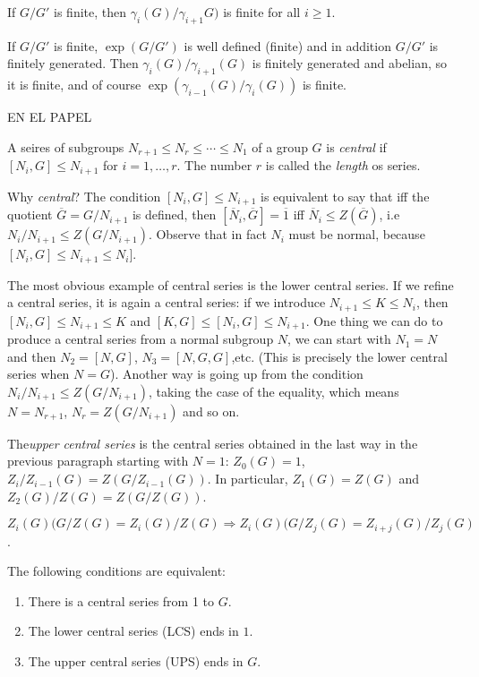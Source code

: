 \documentclass[twoside, 11pt]{article}
\begin{document}
\begin{coro}
If $G/G'$ is finite, then $\gamma_i(G)/\gamma_{i+1}G)$ is finite for all $i\geq 1$. 
\end{coro}
\begin{dem}
If $G/G'$ is finite, $\exp(G/G')$ is well defined (finite) and in addition $G/G'$ is finitely generated. Then $\gamma_i(G)/\gamma_{i+1}(G)$ is finitely generated and abelian, so it is finite, and of course $\exp(\gamma_{i-1}(G)/\gamma_i(G))$ is finite. 
\end{dem}
\begin{ej}
EN EL PAPEL
\end{ej}

\begin{defi}
A seires of subgroups $N_{r+1}\leq N_r\leq\cdots\leq N_1$ of a group $G$ is \emph{central} if $[N_i,G]\leq N_{i+1}$ for $i=1,\dots, r$. The number $r$ is called the \emph{length} os series.
\end{defi}

Why \emph{central}? The condition $[N_i,G]\leq N_{i+1}$ is equivalent to say that iff the quotient $\overline{G}=G/N_{i+1}$ is defined, then $[\overline{N}_i,\overline{G}]=\overline{1}$ iff $\overline{N}_i\leq Z(\overline{G})$, i.e $N_i/N_{i+1}\leq Z(G/N_{i+1})$. Observe that in fact $N_i$ must be normal, because $[N_i,G]\leq N_{i+1}\leq N_i]$. 

The most obvious example of central series is the lower central series. If we refine a central series, it is again a central series: if we introduce $N_{i+1}\leq K\leq N_i$, then $[N_i,G]\leq N_{i+1}\leq K$ and $[K,G]\leq [N_i,G]\leq N_{i+1}$. One thing we can do to produce a central series from a normal subgroup $N$, we can start with $N_1=N$ and then $N_2=[N,G]$, $N_3=[N,G,G]$,etc. (This is precisely the lower central series when $N=G$). Another way is going up from the condition $N_i/N_{i+1}\leq Z(G/N_{i+1})$, taking the case of the equality, which means $N=N_{r+1}$, $N_r=Z(G/N_{i+1})$ and so on.

\begin{defi}
The\emph{upper central series} is the central series obtained in the last way in the previous paragraph starting with $N=1$: $Z_0(G)=1$, $Z_i/Z_{i-1}(G)=Z(G/Z_{i-1}(G))$. In particular, $Z_1(G)=Z(G)$ and $Z_2(G)/Z(G)=Z(G/Z(G))$. 
\end{defi}

$Z_i(G)(G/Z(G)=Z_i(G)/Z(G)\Rightarrow Z_i(G)(G/Z_j(G)=Z_{i+j}(G)/Z_j(G)$.

\begin{teorema}
The following conditions are equivalent:
\begin{enumerate}
\item There is a central series from 1 to $G$.
\item The lower central series (LCS) ends in $1$.
\item The upper central series (UPS) ends in $G$.
\end{enumerate}
\end{teorema}
\end{document}
